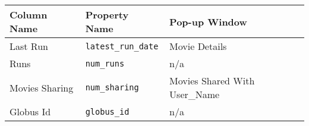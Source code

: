 \begin{tabularx}{\textwidth}{l|l|X}
\toprule
 Column Name    & Property Name   & Pop-up Window                \\
\midrule
 Last Run       & \texttt{latest\_run\_date} & Movie Details                \\
 Runs           & \texttt{num\_runs}        & n/a                          \\
 Movies Sharing & \texttt{num\_sharing}     & Movies Shared With User\_Name \\
 Globus Id      & \texttt{globus\_id}       & n/a                          \\
\bottomrule
\end{tabularx}
